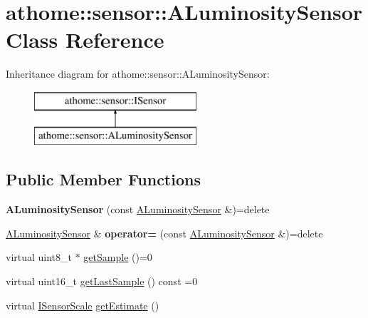 \hypertarget{classathome_1_1sensor_1_1_a_luminosity_sensor}{}\section{athome\+:\+:sensor\+:\+:A\+Luminosity\+Sensor Class Reference}
\label{classathome_1_1sensor_1_1_a_luminosity_sensor}
Inheritance diagram for athome\+:\+:sensor\+:\+:A\+Luminosity\+Sensor\+:\begin{figure}[H]
\begin{center}
\leavevmode
\includegraphics[height=2.000000cm]{classathome_1_1sensor_1_1_a_luminosity_sensor}
\end{center}
\end{figure}
\subsection*{Public Member Functions}
\begin{DoxyCompactItemize}
\item 
\mbox{\label{classathome_1_1sensor_1_1_a_luminosity_sensor_a550beb44964597870cd5c94a3485bbaf}} 
{\bfseries A\+Luminosity\+Sensor} (const \mbox{\hyperlink{classathome_1_1sensor_1_1_a_luminosity_sensor}{A\+Luminosity\+Sensor}} \&)=delete
\item 
\mbox{\label{classathome_1_1sensor_1_1_a_luminosity_sensor_a9a91cdf883f0f06be50a74ec2e73d710}} 
\mbox{\hyperlink{classathome_1_1sensor_1_1_a_luminosity_sensor}{A\+Luminosity\+Sensor}} \& {\bfseries operator=} (const \mbox{\hyperlink{classathome_1_1sensor_1_1_a_luminosity_sensor}{A\+Luminosity\+Sensor}} \&)=delete
\item 
virtual uint8\+\_\+t $\ast$ \mbox{\hyperlink{classathome_1_1sensor_1_1_a_luminosity_sensor_a299491729362d34f474094dfd10eb310}{get\+Sample}} ()=0
\item 
virtual uint16\+\_\+t \mbox{\hyperlink{classathome_1_1sensor_1_1_a_luminosity_sensor_a1cc3cee76cd76486c6e6b51ac484cb2a}{get\+Last\+Sample}} () const =0
\item 
virtual \mbox{\hyperlink{classathome_1_1sensor_1_1_i_sensor_aa70bc27a4c17c86caf96cca776541ddf}{I\+Sensor\+Scale}} \mbox{\hyperlink{classathome_1_1sensor_1_1_a_luminosity_sensor_aa6c0e60c108b0494f0132b033ce3dd82}{get\+Estimate}} ()
\end{DoxyCompactItemize}
